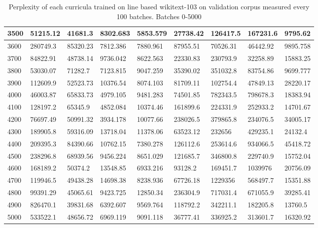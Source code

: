 \documentclass [11pt, proquest] {uwthesis}[2020/12/20]
\begin{document}
\begin{table}
\begin{tiny}
\begin{tabular}{|l|l|l|l|l|l|l|l|l|}
3500 & 51215.12 & 41681.3 & 8302.683 & 5853.579 & 27738.42 & 126417.5 & 167231.6 & 9795.62 \\ \hline
3600 & 280749.3 & 85320.23 & 7812.386 & 7880.961 & 87955.51 & 70526.31 & 46442.92 & 9895.758 \\ \hline
3700 & 84822.91 & 48738.14 & 9736.042 & 8622.563 & 22330.83 & 230793.9 & 32258.89 & 15883.25 \\ \hline
3800 & 53030.07 & 71282.7 & 7123.815 & 9047.259 & 35390.02 & 351032.8 & 83754.86 & 9699.777 \\ \hline
3900 & 112609.9 & 52523.73 & 10376.54 & 8074.103 & 81709.11 & 102754.4 & 47849.13 & 28220.17 \\ \hline
4000 & 46003.87 & 65833.73 & 4979.105 & 9481.283 & 74501.85 & 782343.5 & 798678.3 & 18383.94 \\ \hline
4100 & 128197.2 & 65345.9 & 4852.084 & 10374.46 & 161899.6 & 224331.9 & 252933.2 & 14701.67 \\ \hline
4200 & 76697.49 & 50991.32 & 3934.178 & 10077.66 & 238026.5 & 379865.8 & 234076.5 & 34005.17 \\  \hline
4300 & 189905.8 & 59316.09 & 13718.04 & 11378.06 & 63523.12 & 232656 & 429235.1 & 24132.4 \\ \hline
4400 & 209395.3 & 84390.66 & 10762.15 & 7380.278 & 126112.6 & 253614.6 & 934066.5 & 45418.72 \\ \hline
4500 & 238296.8 & 68939.56 & 9456.224 & 8651.029 & 121685.7 & 346800.8 & 229740.9 & 15752.04 \\ \hline
4600 & 168189.2 & 50374.2 & 13548.85 & 6933.216 & 93128.2 & 169451.7 & 1039976 & 20756.09 \\ \hline
4700 & 119946.5 & 49438.28 & 14698.38 & 8238.936 & 67726.18 & 1229356 & 568497.7 & 15351.88 \\ \hline
4800 & 99391.29 & 45065.61 & 9423.725 & 12850.34 & 236304.9 & 717031.4 & 671055.9 & 39285.41 \\ \hline
4900 & 826470.1 & 39831.68 & 6392.607 & 9569.764 & 118792.2 & 342211.1 & 182205.8 & 13760.5 \\ \hline
5000 & 533522.1 & 48656.72 & 6969.119 & 9091.118 & 36777.41 & 336925.2 & 313601.7 & 16320.92 \\ \hline
\end{tabular}
\end{tiny}
\caption{Perplexity of each curricula trained on line based wikitext-103 on validation corpus measured every 100 batches. Batches 0-5000}
\label{tab:wikitext-103-line-1}
\end{table}
\end{document}
